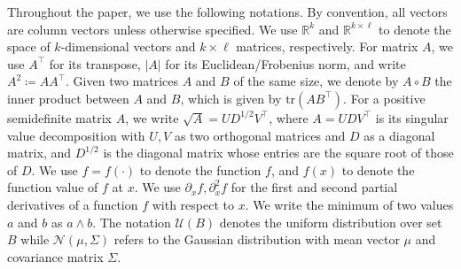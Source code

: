 \documentclass[11pt]{article}
\newcommand{\1}{\mathbbm{1}}
\begin{document}
Throughout the paper, we use the following notations. By convention, all vectors are column vectors unless otherwise specified. We use $\mathbb{R}^k$ and $\mathbb{R}^{k\times \ell}$ to denote the space of $k$-dimensional vectors and $k\times \ell$ matrices, respectively. For matrix $A$, we use $A^\top$ for its transpose, $|A|$ for its Euclidean/Frobenius norm, and write $A^2\coloneqq AA^\top$. Given two matrices $A$ and $B$ of the same size, we denote by $A\circ B$ the inner product between $A$ and $B$, which is given by $\text{tr}(AB^\top)$. For a positive semidefinite matrix $A$, we write $\sqrt{A}=UD^{1/2}V^\top$, where $A=UDV^\top$ is its singular value decomposition with $U,V$ as two orthogonal matrices and $D$ as a diagonal matrix, and $D^{1/2}$ is the diagonal matrix whose entries are the square root of those of $D$.  We use $f=f(\cdot)$ to denote the function $f$, and $f(x)$ to denote the function value of $f$ at $x$. We use  $\partial_xf, \partial_{x}^2f$ for the first and second partial derivatives of a function $f$ with respect to $x$. We write the minimum of two values $a$ and $b$ as $a\wedge b$. The notation $\mathcal{U}(B)$ denotes the uniform distribution over set $B$ while $\mathcal{N}(\mu,\Sigma)$ refers to the Gaussian distribution with mean vector $\mu$ and covariance matrix $\Sigma$.
\end{document}
